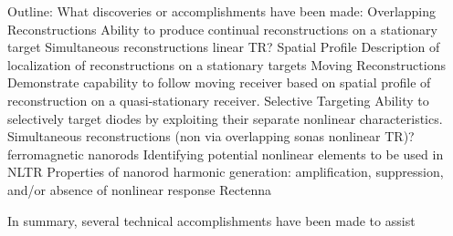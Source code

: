 Outline:
	What discoveries or accomplishments have been made:
Overlapping Reconstructions
Ability to produce continual reconstructions on a stationary target
Simultaneous reconstructions {linear TR}?
Spatial Profile
Description of localization of reconstructions on a stationary targets
Moving Reconstructions
Demonstrate capability to follow moving receiver based on spatial profile of reconstruction on a quasi-stationary receiver.
Selective Targeting
Ability to selectively target diodes by exploiting their separate nonlinear characteristics.
Simultaneous reconstructions (non via overlapping sonas {nonlinear TR})?
ferromagnetic nanorods
Identifying potential nonlinear elements to be used in NLTR
Properties of nanorod harmonic generation: amplification, suppression, and/or absence of nonlinear response
Rectenna

In summary, several technical accomplishments have been made to assist
